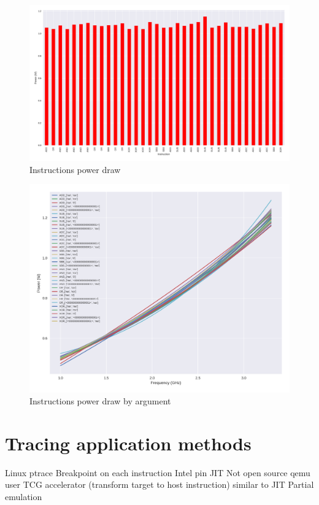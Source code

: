 \begin{figure}
	\centering
	\includegraphics[width=\textwidth]{experiments/figures/inst_pw_generic.png}
	\caption{Instructions power draw}
	\label{fig:experiment_pw1}
\end{figure}
\begin{figure}
	\centering
	\includegraphics[width=\textwidth]{experiments/figures/inst_pw_args.png}
	\caption{Instructions power draw by argument}
	\label{fig:experiment_pw2}
\end{figure}

\section{Tracing application methods}

\begin{outline}
	\1 Linux ptrace
		\2 Breakpoint on each instruction	
	\1 Intel pin
		\2 JIT
		\2 Not open source
	\1 qemu user
		\2 TCG accelerator (transform target to host instruction) similar to JIT
		\2 Partial emulation
\end{outline}

